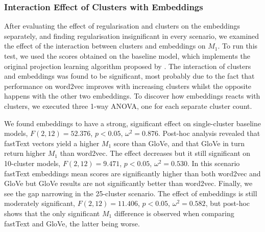 \subsubsection{Interaction Effect of Clusters with Embeddings}
After evaluating the effect of regularisation and clusters on the embeddings separately, and finding  regularisation insignificant in every scenario, we examined the effect of the interaction between clusters and embeddings on $M_1$.  To run this test, we used the scores obtained on the baseline model, which implements the original projection learning algorithm proposed by \citet{Fu2014}.  The interaction of clusters and embeddings was found to be significant, most probably due to the fact that performance on word2vec improves with increasing clusters whilst the opposite happens with the other two embeddings. To discover how embeddings reacts with clusters, we executed three 1-way \ac{ANOVA}, one for each separate cluster count.  

We found embeddings to have a strong, significant effect on single-cluster baseline models, $F(2,12)=52.376$, $p < 0.05$, $\omega^2=0.876$.  Post-hoc analysis revealed that fastText vectors yield a higher $M_1$ score than GloVe, and that GloVe in turn return higher $M_1$ than word2vec.  The effect decreases but it still significant on 10-cluster models, $F(2,12)=9.471$, $p < 0.05$, $\omega^2=0.530$.  In this scenario fastText embeddings mean scores are significantly higher than both word2vec and GloVe but GloVe results are not significantly better than word2vec.  Finally, we see the gap narrowing in the 25-cluster scenario.  The effect of embeddings is still moderately significant, $F(2,12)=11.406$, $p < 0.05$, $\omega^2=0.582$, but post-hoc shows that the only significant $M_1$ difference is observed when comparing fastText and GloVe, the latter being worse.  

